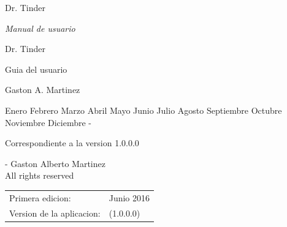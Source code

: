 \documentclass[10pt,letterpaper,extrafontsizes]{memoir}
\newcommand{\MONTH}{%
  \ifcase\the\month
  \or Enero %
  \or Febrero %
  \or Marzo %
  \or Abril %
  \or Mayo %
  \or Junio %
  \or Julio %
  \or Agosto %
  \or Septiembre %
  \or Octubre %
  \or Noviembre %
  \or Diciembre %
  \fi}
\begin{document}
\tightlists
\midsloppy
\raggedbottom



\frontmatter
\pagestyle{empty}


\vspace*{\fill}
\begin{adjustwidth}{1in}{1in}
\begin{flushleft}
\HUGE\sffamily
\end{flushleft}
\begin{center}
\HUGE\sffamily  Dr. Tinder
\end{center}
\begin{flushright}
\LARGE \ttfamily  \textit{Manual de usuario}\\
\end{flushright}
\end{adjustwidth}
\vspace*{\fill}
\cleardoublepage

\vspace*{\fill}
\begin{center}
\HUGE\textsf{Dr. Tinder}\par
\end{center}
\begin{center}
\HUGE\textsf{Guia del usuario}\par
\end{center}

\begin{center}
\Huge\textsf{ }\par
\end{center}
\begin{center}
\LARGE\textsf{Gaston A. Martinez}\par
\bigskip
\normalsize\textsf{ \MONTH - \the \year }\par
\normalsize\textsf{Correspondiente a la version 1.0.0.0}\par
\medskip
\end{center}
\vspace*{\fill}
\clearpage

\begingroup
\footnotesize
\setlength{\parindent}{0pt}
\setlength{\parskip}{\baselineskip}
\textcopyright{} \the \year - Gaston Alberto Martinez\\
All rights reserved

\begin{center}
\begin{tabular}{ll}
Primera edicion:                        & Junio 2016 \\
Version de la aplicacion: & (1.0.0.0)
\end{tabular}
\end{center}
\end{document}
